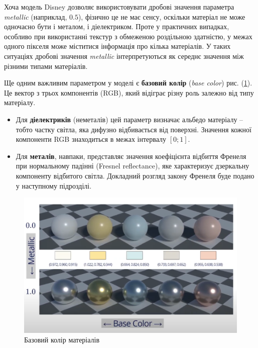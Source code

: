 \par
Хоча модель Disney дозволяє використовувати дробові значення па\-ра\-мет\-ра \textit{metallic} (наприклад, $0.5$), фізично це не має сенсу, оскільки матеріал не може 
одночасно бути і металом, і діелектриком. Проте у практичних випадках, особливо при використанні текстур з обмеженою роздільною здатністю, у межах одного 
пікселя може міститися інформація про кілька матеріалів. У таких ситуаціях дробові значення \textit{metallic} інтерпретуються як середнє значення між різними типами 
матеріалів.

\par
Ще одним важливим параметром у моделі є \textbf{базовий колір} (\textit{base color}) рис. (\ref{fig:BC}). Це вектор з трьох компонентів (RGB), 
який відіграє різну роль за\-леж\-но від типу матеріалу.

\begin{itemize}
    \item Для \textbf{діелектриків} (неметалів) цей параметр визначає альбедо ма\-те\-ріа\-лу -- тобто частку світла, яка дифузно відбивається від поверхні. Значення кожної 
    компоненти RGB знаходиться в межах інтервалу $[0;1]$.
    
    \item Для \textbf{металів}, навпаки,  представляє значення коефіцієнта відбиття Френеля при нормальному падінні (Fresnel reflectance), яке 
    характеризує дзеркальну компоненту відбитого світла. Докладний розгляд закону Френеля буде подано у наступному підрозділі.
\end{itemize}

\begin{figure}[h]
  \centering
  \includegraphics[scale=0.6]{Pictures/BaseColor.png}
  \caption{Базовий колір матеріалів}
  \label{fig:BC}
\end{figure}

